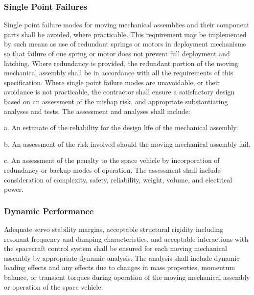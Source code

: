 \documentclass[12pt]{article}
\begin{document}
\subsubsection{Single Point Failures} %
Single point failure modes for moving mechanical assemblies and their component parts shall be avoided, where practicable. 
This requirement may be implemented by such means as use of redundant springs or motors in deployment mechanisms so that failure of one spring or motor does not prevent full deployment and latching. 
Where redundancy is provided, the redundant portion of the moving mechanical assembly shall be in accordance with all the requirements of this specification. 
Where single point failure modes are unavoidable, or their avoidance is not practicable, the contractor shall ensure a satisfactory design based on an assessment of the mishap risk, and appropriate substantiating analyses and tests. 
The assessment and analyses shall include:

a. An estimate of the reliability for the design life of the mechanical assembly.

b. An assessment of the risk involved should the moving mechanical assembly fail.

c. An assessment of the penalty to the space vehicle by incorporation of redundancy or backup modes of operation. 
The assessment shall include consideration of complexity, safety, reliability, weight, volume, and electrical power.

\subsubsection{Dynamic Performance} %
Adequate servo stability margins, acceptable structural rigidity including resonant frequency and damping characteristics, and acceptable interactions with the spacecraft control system shall be ensured for each moving mechanical assembly by appropriate dynamic analysis. 
The analysis shall include dynamic loading effects and any effects due to changes in mass properties, momentum balance, or transient torques during operation of the moving mechanical assembly or operation of the space vehicle.
\end{document}
